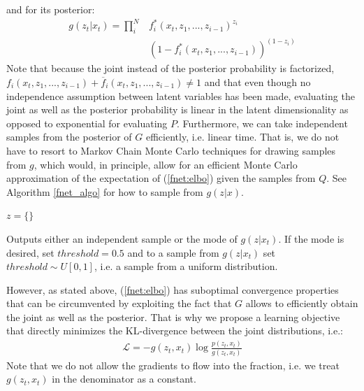 and for its posterior:
\begin{align*}
g(z_{t}| x_{t}) = \prod_i^N &f^*_i(x_t, z_1, ..., z_{i-1})^{z_i} \\
			&(1- f^*_i(x_t, z_1, ..., z_{i-1}))^{(1-z_i)}
\end{align*} 
Note that because the joint instead of the posterior probability is factorized, $f_i(x_t, z_1, ..., z_{i-1}) + \overline{f}_i(x_t, z_1, ..., z_{i-1}) \neq 1$ and that even though no independence assumption between latent variables has been made, evaluating the joint as well as the posterior probability is linear in the latent dimensionality as opposed to exponential for evaluating $P$. Furthermore, we can take independent samples from the posterior of $G$ efficiently, i.e. linear time. That is, we do not have to resort to Markov Chain Monte Carlo techniques for drawing samples from $g$, which would, in principle, allow for an efficient Monte Carlo approximation of the expectation of (\ref{fnet:elbo}) given the samples from $Q$. See Algorithm \ref{fnet_algo} for how to sample from $g(z|x)$.

\begin{algorithm}
 $z = \{\}$\;
 \caption{Outputs either an independent sample or the mode of $g(z|x_t)$. If the mode is desired, set $threshold = 0.5$ and to a sample from $g(z|x_t)$ set $threshold \sim U[0,1]$, i.e. a sample from a uniform distribution.}
 \label{fnet_algo}
\end{algorithm}

However, as stated above, (\ref{fnet:elbo}) has suboptimal convergence properties that can be circumvented by exploiting the fact that $G$ allows to efficiently obtain the joint as well as the posterior. That is why we propose a learning objective that directly minimizes the KL-divergence between the joint distributions, i.e.:
\begin{align*}
\mathcal{L} = -g(z_t, x_t) \log \frac{p(z_t, x_t)}{g(z_t, x_t)}
\end{align*}
Note that we do not allow the gradients to flow into the fraction, i.e. we treat $g(z_t, x_t)$ in the denominator as a constant.

